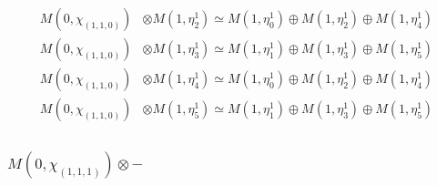 \begin{align*}
M(0,\chi_{(1,1,0)}) &\otimes M(1,\eta^{1}_{2}) \simeq M(1,\eta^{1}_{0}) \oplus M(1,\eta^{1}_{2}) \oplus M(1,\eta^{1}_{4}) \\
M(0,\chi_{(1,1,0)}) &\otimes M(1,\eta^{1}_{3}) \simeq M(1,\eta^{1}_{1}) \oplus M(1,\eta^{1}_{3}) \oplus M(1,\eta^{1}_{5}) \\
M(0,\chi_{(1,1,0)}) &\otimes M(1,\eta^{1}_{4}) \simeq M(1,\eta^{1}_{0}) \oplus M(1,\eta^{1}_{2}) \oplus M(1,\eta^{1}_{4}) \\
M(0,\chi_{(1,1,0)}) &\otimes M(1,\eta^{1}_{5}) \simeq M(1,\eta^{1}_{1}) \oplus M(1,\eta^{1}_{3}) \oplus M(1,\eta^{1}_{5}) \\
\end{align*}

\subsubsection{$ M(0,\chi_{(1,1,1)})\otimes -$}
